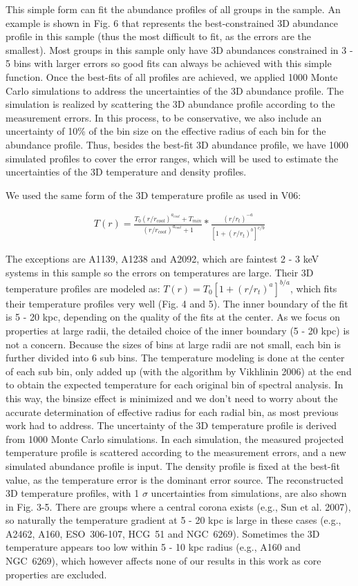 \documentclass{aastex}
\begin{document}
This simple form can fit the abundance profiles of all groups in the sample.
An example is shown in Fig. 6 that represents the best-constrained 3D abundance
profile in this sample (thus the most difficult to fit, as the errors are the smallest).
Most groups in this sample only have 3D abundances constrained
in 3 - 5 bins with larger errors so good fits can always be achieved with this simple
function. Once the best-fits of all profiles are achieved, we applied 1000 Monte Carlo
simulations to address the uncertainties of the 3D abundance profile. The simulation is
realized by scattering the 3D abundance profile according to the measurement
errors. In this process,
to be conservative, we also include an uncertainty of 10\% of the bin size on the
effective radius of each bin for the abundance profile.
Thus, besides the best-fit 3D abundance profile, we have 1000 simulated profiles to
cover the error ranges, which will be used to estimate
the uncertainties of the 3D temperature and density profiles.

We used the same form of the 3D temperature profile as used in V06:

\begin{eqnarray}
T(r) = \frac{T_{0}(r/r_{cool})^{a_{cool}}+T_{min}}{(r/r_{cool})^{a_{cool}}+1}
 * \frac{(r/r_{t})^{-a}}{[1+(r/r_{t})^{b}]^{c/b}}
\end{eqnarray}

The exceptions are A1139, A1238 and A2092, which are faintest 2 - 3 keV systems
in this sample so the errors on temperatures are large. Their 3D temperature
profiles are modeled as: $T(r) = T_{0} [1+(r/r_{t})^{a}]^{b/a}$, which fits their
temperature profiles very well (Fig. 4 and 5). 
The inner boundary of the fit is 5 - 20 kpc, depending on the quality of the fits
at the center. As we focus on properties at large radii, the detailed choice of the 
inner boundary (5 - 20 kpc) is not a concern.
Because the sizes of bins at large radii are not small, each bin is further divided into 6
sub bins. The temperature modeling is done at the center of each sub bin, only added up
(with the algorithm by Vikhlinin 2006) at the end to obtain the expected
temperature for each original bin of spectral analysis. In this way, the binsize effect
is minimized and we don't need to worry about the accurate determination of effective
radius for each radial bin, as most previous work had to address.
The uncertainty of the 3D temperature profile
is derived from 1000 Monte Carlo simulations. In each simulation, the measured projected
temperature profile is scattered according to the measurement errors, and a new simulated
abundance profile is input. The density profile is fixed at the best-fit value, as the
temperature error is the dominant error source.
The reconstructed 3D temperature profiles, with 1 $\sigma$ uncertainties from simulations,
are also shown in Fig. 3-5. There are groups where a central corona exists
(e.g., Sun et al. 2007), so naturally the temperature gradient at 5 - 20 kpc
is large in these cases (e.g., A2462, A160, ESO~306-107, HCG~51 and NGC~6269). Sometimes
the 3D temperature appears too low within 5 - 10 kpc radius (e.g., A160 and NGC~6269),
which however affects none of our results in this work as core properties are
excluded.
\end{document}
